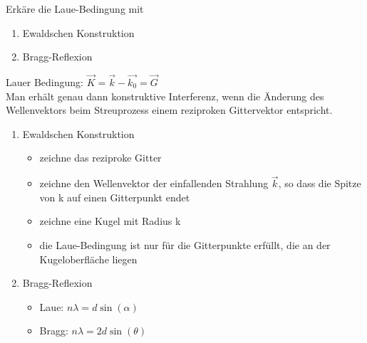 \documentclass[a5paper,12pt,ngerman,grid=front %
,print
]{kartei}
\begin{document}
	\begin{karte}{
		Erkäre die Laue-Bedingung mit
		\begin{enumerate}[label={\alph*)}] 
			\item Ewaldschen Konstruktion
			\item Bragg-Reflexion 
		\end{enumerate}
		}
		
		Lauer Bedingung: $  \vec{K} = \vec{k} - \vec{k_0} = \vec{G}  $ \\
		Man erhält genau dann konstruktive Interferenz, wenn die Änderung des Wellenvektors beim Streuprozess einem reziproken Gittervektor entspricht.
		\begin{enumerate}[label={\alph*)}] 
			\item Ewaldschen Konstruktion
				\begin{itemize}
					\item zeichne das reziproke Gitter
					\item zeichne den Wellenvektor der einfallenden Strahlung $\vec{k}$, so dass die Spitze von k auf einen Gitterpunkt endet
					\item zeichne eine Kugel mit Radius k
					\item die Laue-Bedingung ist nur für die Gitterpunkte erfüllt, die an der Kugeloberfläche liegen
				\end{itemize}
			\item Bragg-Reflexion
				\begin{itemize}
					\item Laue: $ n \lambda = d \sin(\alpha) $ 
					\item Bragg: $n \lambda = 2d \sin(\theta) $
				\end{itemize}
		\end{enumerate}
		

\end{karte}
\end{document}
